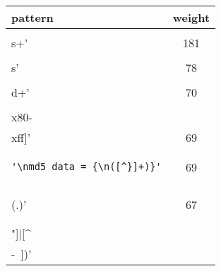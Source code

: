 \begin{center}
\begin{tabular}{lc}
\toprule
pattern & weight \\ 
\midrule
\begin{minipage}{2.3in}
\begin{verbatim}
'\\s+'\end{verbatim}
\end{minipage}
& 181 \\ 
\midrule
\begin{minipage}{2.3in}
\begin{verbatim}
'\\s'\end{verbatim}
\end{minipage}
& 78 \\ 
\midrule
\begin{minipage}{2.3in}
\begin{verbatim}
'\\d+'\end{verbatim}
\end{minipage}
& 70 \\ 
\midrule
\begin{minipage}{2.3in}
\begin{verbatim}
'[\\x80-\\xff]'\end{verbatim}
\end{minipage}
& 69 \\ 
\midrule
\begin{minipage}{2.3in}
\begin{verbatim}
'\nmd5_data = {\n([^}]+)}'\end{verbatim}
\end{minipage}
& 69 \\ 
\midrule
\begin{minipage}{2.3in}
\begin{verbatim}
'\\\\(.)'\end{verbatim}
\end{minipage}
& 67 \\ 
\midrule
\begin{minipage}{2.3in}
\begin{verbatim}
'([\\\\"]|[^\\ -~])'\end{verbatim}
\end{minipage}

\end{tabular}
\end{center}

